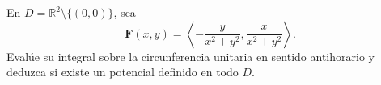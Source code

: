 En $D=\mathbb R^2\setminus\{(0,0)\}$, sea
\[
\mathbf{F}(x,y)=\left\langle-\frac{y}{x^2+y^2},\frac{x}{x^2+y^2}\right\rangle.
\]
Evalúe su integral sobre la circunferencia unitaria en sentido antihorario y deduzca si existe un potencial definido en todo $D$.
